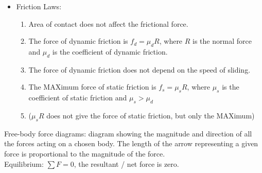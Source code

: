 \documentclass[a4paper,12pt]{article}
\begin{document}
\begin{itemize}
\begin{itemize}
\begin{center}
    {\small Real surfaces touch at asperities; junctions must shear or break before sliding occurs.}
  \end{center}
    \item Friction Laws:
    \begin{enumerate}
      \item Area of contact does not affect the frictional force.
      \item The force of dynamic friction is $f_d=\mu_dR$, where $R$ is the normal force and $\mu_d$ is the coefficient of dynamic friction.
      \item The force of dynamic friction does not depend on the speed of sliding.
      \item The MAXimum force of static friction is $f_s=\mu_sR$, where $\mu_s$ is the coefficient of static friction and $\mu_s>\mu_d$
      \item ($\mu_sR$ does not give the force of static friction, but only the MAXimum)
	    \end{enumerate}
	  \end{itemize}

  \begin{center}
  \end{center}
\end{itemize}
Free-body force diagrams: diagram showing the magnitude and direction of all the forces acting on a chosen body. The length of the arrow representing a given force is proportional to the magnitude of the force. \\
Equilibrium: $\displaystyle \sum F=0$, the resultant / net force is zero.
\end{document}
